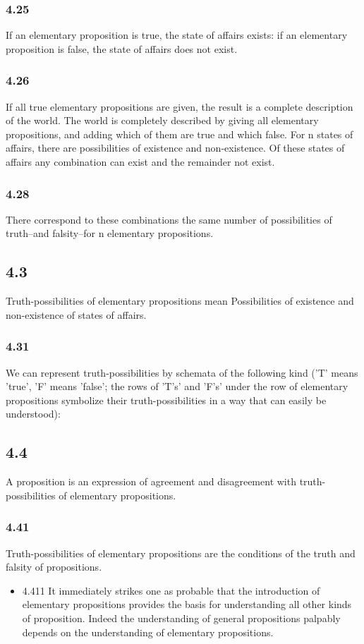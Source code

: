 \documentclass[11pt]{article}
\begin{document}
\subsubsection*{4.25}
\label{sec:org504e43d}
If an elementary proposition is true, the state of affairs exists: if
an elementary proposition is false, the state of affairs does not exist.
\subsubsection*{4.26}
\label{sec:org19d5867}
If all true elementary propositions are given, the result is a
complete description of the world. The world is completely described by
giving all elementary propositions, and adding which of them are true and
which false. For n states of affairs, there are possibilities of existence
and non-existence. Of these states of affairs any combination can exist and
the remainder not exist.
\subsubsection*{4.28}
\label{sec:orge023029}
There correspond to these combinations the same number of
possibilities of truth--and falsity--for n elementary propositions.
\subsection*{4.3}
\label{sec:org9a3ba33}
Truth-possibilities of elementary propositions mean Possibilities of
existence and non-existence of states of affairs.
\subsubsection*{4.31}
\label{sec:org4963e67}
We can represent truth-possibilities by schemata of the following kind
('T' means 'true', 'F' means 'false'; the rows of 'T's' and 'F's' under the
row of elementary propositions symbolize their truth-possibilities in a way
that can easily be understood):
\subsection*{4.4}
\label{sec:org96dbace}
A proposition is an expression of agreement and disagreement with truth-
possibilities of elementary propositions.
\subsubsection*{4.41}
\label{sec:org75f16f3}
Truth-possibilities of elementary propositions are the conditions of
the truth and falsity of propositions.
\begin{itemize}
\item 4.411
\label{sec:org65a4aa6}
It immediately strikes one as probable that the introduction of
elementary propositions provides the basis for understanding all other
kinds of proposition. Indeed the understanding of general propositions
palpably depends on the understanding of elementary propositions.
\end{itemize}
\end{document}

